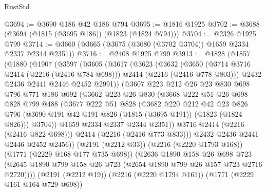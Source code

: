 \begin{lexlean}{RustStd}
\begin{coremodule}
@3694 := @3690 @186 @42 @186 @794
@3695 := @1816 @1925
@3702 := @3688 (@3694 (@1815 (@3695 @186)) (@1823 (@1824 @794)))
@3704 := @2326 @1925 @799
@3714 := @3660 (@3665 (@3675 (@3680 (@3702 @3704)) @1659 @2334 @2337 @2344 @2351))
@3716 := @2408 @1925 @799
@3913 := @1828
    (@1857
      (@1880
        (@1907
          (@3597
            (@3605
              (@3617
                (@3623
                  (@3632
                    (@3650
                      (@3714 @3716 @2414 (@2216 (@2416 @784 @698)))
                      @2414
                      (@2216 (@2416 @778 @803)))
                    @2432
                    @2436
                    @2441
                    @2446
                    @2452
                    @2991))
                (@3607
                  @223
                  @212
                  @26
                  @23
                  @830
                  @698
                  @796
                  @771
                  @186
                  @692
                  (@3662
                    @223
                    @26
                    @830
                    (@3668
                      @222
                      @51
                      @26
                      @698
                      @828
                      @799
                      @488
                      (@3677
                        @222
                        @51
                        @828
                        (@3682
                          @220
                          @212
                          @42
                          @23
                          @826
                          @796
                          (@3690 @191 @42 @191 @826 (@1815 (@3695 @191)) (@1823 (@1824 @826)))
                          @3704))
                      @1659
                      @2334
                      @2337
                      @2344
                      @2351))
                  @3716
                  @2414
                  (@2216 (@2416 @822 @698)))
                @2414
                (@2216 (@2416 @773 @833)))
              @2432
              @2436
              @2441
              @2446
              @2452
              @2456))
          (@2191 (@2212 @33))
          (@2216 (@2220 @1793 @168))
          (@1771 (@2229 @168 @177 @735 @698))
          (@2636
            @1890
            @158
            @26
            @698
            @723
            (@2645 @1890 @799 @158 @26 @723 (@2654 @1890 @799 @26 @157 @723 @2716 @2720))))
        (@2191 (@2212 @19))
        (@2216 (@2220 @1794 @161))
        (@1771 (@2229 @161 @164 @729 @698))

\end{coremodule}
\end{lexlean}

